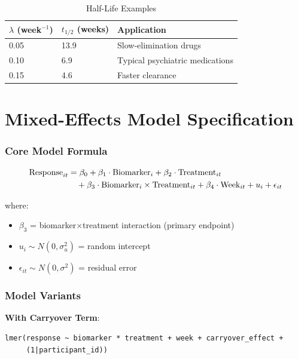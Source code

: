 \documentclass[11pt]{article}
\theoremstyle{definition}
\begin{document}
\begin{table}[h]
\centering
\caption{Half-Life Examples}
\begin{tabular}{@{}lll@{}}
\toprule
\textbf{$\lambda$ (week$^{-1}$)} & \textbf{$t_{1/2}$ (weeks)} & \textbf{Application} \\
\midrule
0.05 & 13.9 & Slow-elimination drugs \\
0.10 & 6.9 & Typical psychiatric medications \\
0.15 & 4.6 & Faster clearance \\
\bottomrule
\end{tabular}
\end{table}

\part{Mixed-Effects Model Specification}

\section{Core Model Formula}

\begin{align}
\text{Response}_{it} &= \beta_0 + \beta_1 \cdot \text{Biomarker}_i +
\beta_2 \cdot \text{Treatment}_{it} \notag \\
&\quad + \beta_3 \cdot \text{Biomarker}_i \times \text{Treatment}_{it} +
\beta_4 \cdot \text{Week}_{it} + u_i + \epsilon_{it}
\end{align}

where:
\begin{itemize}
    \item $\beta_3$ = biomarker$\times$treatment interaction (primary endpoint)
    \item $u_i \sim N(0, \sigma_u^2)$ = random intercept
    \item $\epsilon_{it} \sim N(0, \sigma^2)$ = residual error
\end{itemize}

\section{Model Variants}

\textbf{With Carryover Term}:
\begin{lstlisting}
lmer(response ~ biomarker * treatment + week + carryover_effect +
     (1|participant_id))
\end{lstlisting}
\end{document}
